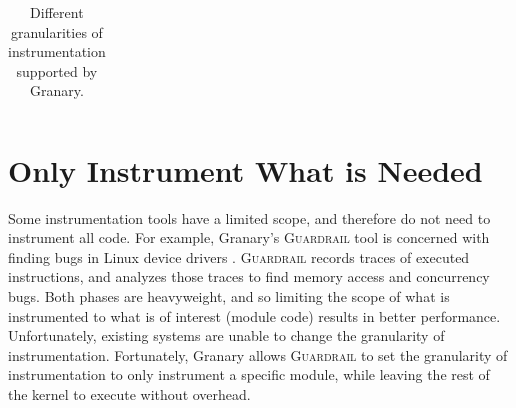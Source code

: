 \documentclass[preprint]{sigplanconf}
\newcommand{\toolname}[1]{{\scshape #1}}
\begin{document}
\begin{table}[ht!]
\begin{tabularx}{\linewidth}{| l | >{\raggedright}p{0.3\linewidth} | X |}
\hline
\end{tabularx}
\caption{\label{tab:granularities}Different granularities of instrumentation supported by Granary.}
\end{table}

\section{Only Instrument What is Needed}\label{sec:what}

Some instrumentation tools have a limited scope, and therefore do not need to instrument all code. For example, Granary's \toolname{Guardrail} tool is concerned with finding bugs in Linux device drivers \cite{Guardrail}. \toolname{Guardrail} records traces of executed instructions, and analyzes those traces to find memory access and concurrency bugs. Both phases are heavyweight, and so limiting the scope of what is instrumented to what is of interest (module code) results in better performance. Unfortunately, existing systems are unable to change the granularity of instrumentation. Fortunately, Granary allows \toolname{Guardrail} to set the granularity of instrumentation to only instrument a specific module, while leaving the rest of the kernel to execute without overhead.





\end{document}
